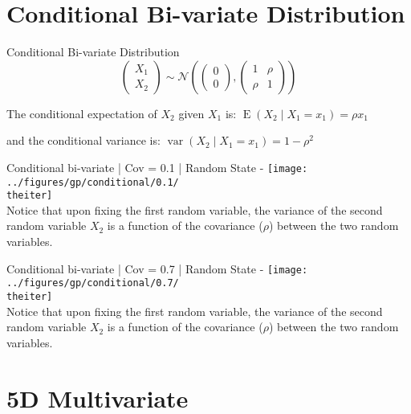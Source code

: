 \documentclass{beamer}
\begin{document}
	\section{Conditional Bi-variate Distribution}
	
	\begin{frame}{Conditional Bi-variate Distribution}
		$$
		\begin{pmatrix}
		X_1 \\
		X_2
		\end{pmatrix}  \sim \mathcal{N} \left( \begin{pmatrix}
		0 \\
		0
		\end{pmatrix} , \begin{pmatrix}
		1 & \rho \\
		\rho & 1
		\end{pmatrix} \right)
		$$
		
		The conditional expectation of $X_2$ given $X_1$ is: $\operatorname{E}(X_2 \mid X_1=x_1)= \rho x_1$
		
		and the conditional variance is: $\operatorname{var}(X_2 \mid X_1 = x_1) = 1-\rho^2$
	\end{frame}
	
	{%
		\begin{frame}{Conditional bi-variate | Cov = 0.1 | Random State - \theiter}
			\texttt{[image: ../figures/gp/conditional/0.1/\\theiter]}\\
			Notice that upon fixing the first random variable, the variance of the second random variable $X_2$ is a function of the covariance ($\rho$) between the two random variables.
		\end{frame}
	}
	
	{%
		\begin{frame}{Conditional bi-variate | Cov = 0.7 | Random State - \theiter}
			\texttt{[image: ../figures/gp/conditional/0.7/\\theiter]}\\
			Notice that upon fixing the first random variable, the variance of the second random variable $X_2$ is a function of the covariance ($\rho$) between the two random variables.
		\end{frame}
	}
	
	\section{5D Multivariate}
	
\end{document}
